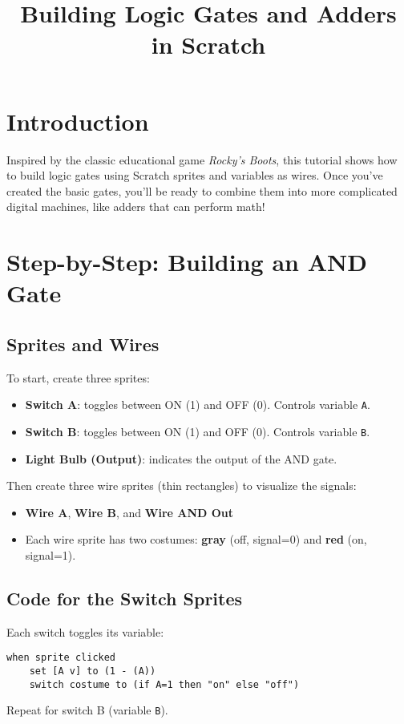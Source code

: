 \documentclass[12pt]{article}
\title{Building Logic Gates and Adders in Scratch}
\author{}
\date{}
\begin{document}
\maketitle

\section*{Introduction}
Inspired by the classic educational game \textit{Rocky's Boots}, this tutorial shows how to build logic gates using Scratch sprites and variables as wires. Once you've created the basic gates, you'll be ready to combine them into more complicated digital machines, like adders that can perform math!

\section*{Step-by-Step: Building an AND Gate}

\subsection*{Sprites and Wires}

To start, create three sprites:
\begin{itemize}
    \item \textbf{Switch A}: toggles between ON (1) and OFF (0). Controls variable \texttt{A}.
    \item \textbf{Switch B}: toggles between ON (1) and OFF (0). Controls variable \texttt{B}.
    \item \textbf{Light Bulb (Output)}: indicates the output of the AND gate.
\end{itemize}

Then create three wire sprites (thin rectangles) to visualize the signals:
\begin{itemize}
    \item \textbf{Wire A}, \textbf{Wire B}, and \textbf{Wire AND Out}
    \item Each wire sprite has two costumes: \textbf{gray} (off, signal=0) and \textbf{red} (on, signal=1).
\end{itemize}

\subsection*{Code for the Switch Sprites}

Each switch toggles its variable:
\begin{verbatim}
when sprite clicked
    set [A v] to (1 - (A))
    switch costume to (if A=1 then "on" else "off")
\end{verbatim}
Repeat for switch B (variable \texttt{B}).
\end{document}
